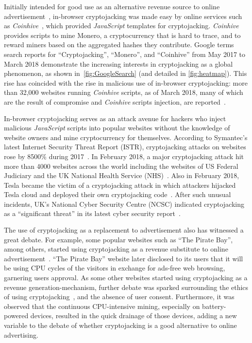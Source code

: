 \documentclass[acmlarge]{acmart}
\newcommand{\ch}{{\em Coinhive}\xspace}
\newcommand{\js}{{\em JavaScript}\xspace}
\newcommand{\cc}{{cryptocurrency}\xspace}
\newcommand{\cj}{cryptojacking\xspace}
\begin{document}
Initially intended for good use as an alternative revenue source to online advertisement~\cite{kerbs}, in-browser \cj was made easy by online services such as \ch~\cite{coinhive}, which provided \js templates for \cj. \ch provides scripts to mine Monero, a \cc that is hard to trace, and to reward miners based on the aggregated hashes they contribute.  Google terms search reports for ``Cryptojacking'', ``Monero'', and ``Coinhive'' from May 2017 to March 2018 demonstrate the increasing interests in \cj as a global phenomenon, as shown in~\autoref{fig:GoogleSearch} (and detailed in \autoref{fig:heatmap}). This rise has coincided with the rise in malicious use of in-browser \cj: more than 32,000 websites running \ch scripts, as of March 2018, many of which are the result of compromise and \ch scripts injection, are reported~\cite{kerbs}.






In-browser \cj serves as an attack avenue for hackers who inject malicious \js scripts into popular websites without the knowledge of website owners and mine \cc for themselves. According to Symantec's latest Internet Security Threat Report (ISTR), \cj attacks on websites rose by 8500\% during 2017~\cite{Mathur_18,Singh_18}. In February 2018, a major \cj attack hit more than 4000 websites across the world including the websites of US Federal Judiciary and the UK National Health Service (NHS)~\cite{condliffe_18}. Also in February 2018, Tesla became the victim of a \cj attack in which attackers hijacked Tesla cloud and deployed their own \cj code~\cite{Rayome_18}. After such unusual incidents, UK's National Cyber Security Centre (NCSC) indicated \cj as a ``significant threat'' in its latest cyber security report~\cite{de_18,ncsc_18}. 



The use of \cj as a replacement to advertisement also has witnessed a great debate. For example, some popular websites such as ``The Pirate Bay'', among others, started using \cj as a revenue substitute to online advertisement~\cite{Shaikh_17,Ernesto_17,Jones_2017}. ``The Pirate Bay'' website later disclosed to its users that it will be using CPU cycles of the visitors in exchange for ads-free web browsing, garnering users approval. As some other websites started using \cj as a revenue generation-mechanism, further debate was sparked surrounding the ethics of using \cj~\cite{Zuckerman_2018}, and the absence of user consent. Furthermore, it was observed that the continuous CPU-intensive mining, especially on battery-powered devices, resulted in the quick drainage of those devices, adding a new variable to the debate of whether \cj is a good alternative to online advertising. 
\end{document}
